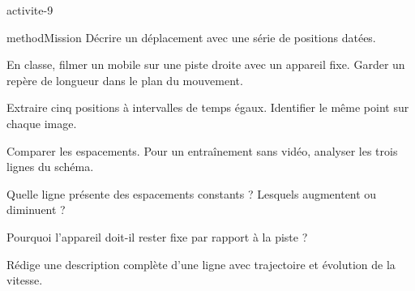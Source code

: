 \documentclass[12pt,twoside,openany]{book}
\begin{document}
\label{ch-9-activite}
\begin{pcFiche}{activite-9}
\begin{pcEncadre}{method}{Mission}
Décrire un déplacement avec une série de positions datées.\par
\end{pcEncadre}
\begin{questions}
\item En classe, filmer un mobile sur une piste droite avec un appareil fixe. Garder un repère de longueur dans le plan du mouvement.
\item Extraire cinq positions à intervalles de temps égaux. Identifier le même point sur chaque image.
\item Comparer les espacements. Pour un entraînement sans vidéo, analyser les trois lignes du schéma.
\end{questions}
\begin{questions}
\item Quelle ligne présente des espacements constants ? Lesquels augmentent ou diminuent ?
\item Pourquoi l’appareil doit-il rester fixe par rapport à la piste ?
\item Rédige une description complète d’une ligne avec trajectoire et évolution de la vitesse.
\end{questions}
\end{pcFiche}
\label{ch-9-bilan}
\end{document}
